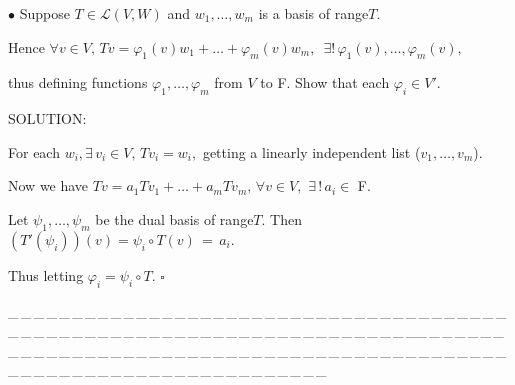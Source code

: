 \documentclass[a4paper, 11pt, UTF8]{article}
\def\Lm{\mathcal{L}}
\begin{document}
\begin{large}
{\small$\bullet$} {\timessl\Large Suppose $T \in \Lm(V, W)$ 
and $w_{1} , \dots , w_{m}$ is a basis of range$T$.}\par\quad
{\timessl\Large
Hence $\forall v \in V,\,Tv=\varphi_{1}(v)w_{1}+\dots+\varphi_{m}(v)w_{m},\,\,\,\exists ! \,\varphi_{1} (v), \dots , \varphi_{m}(v),$}\par\quad
{\timessl\Large
thus defining functions $\varphi_{1}, \dots , \varphi_{m}$ from $V$ to {\timesbf F}. 
Show that each $\varphi_{i} \in V'$.}\par

{\timesbf S\footnotesize{OLUTION:}} $\,\,$\par\quad
For each $w_{i},\exists\,v_{i} \in V,\,Tv_{i}=w_{i},$
getting a linearly independent list ($v_{1},\dots, v_{m}$).\par\quad
Now we have $Tv=a_{1}Tv_{1}+\dots+a_{m}Tv_{m},\,\forall v \in V,$ $\exists\,!\,a_{i}\in$ {\timesbf F}$.$\par\quad
Let $\psi_{1}, \dots, \psi_{m}$ be the dual basis of range$T$. Then $(T'(\psi_{i}))(v)=\psi_{i}\circ T(v)\,=\,a_{i}.$\par\quad
Thus letting $\varphi_{i}=\psi_{i}\circ T.$ \quad$\square$

{\tiny \_\,\_\,\_\,\_\,\_\,\_\,\_\,\_\,\_\,\_\,\_\,\_\,\_\,\_\,\_\,\_\,\_\,\_\,\_\,\_\,\_\,\_\,\_\,\_\,\_\,\_\,\_\,\_\,\_\,\_\,\_\,\_\,\_\,\_\,\_\,\_\,\_\,\_\,\_\,\_\,\_\,\_\,\_\,\_\,\_\,\_\,\_\,\_\,\_\,\_\,\_\,\_\,\_\,\_\,\_\,\_\,\_\,\_\,\_\,\_\,\_\,\_\,\_\,\_\,\_\,\_\,\_\,\_\,\_\,\_\,\_\_\,\_\,\_\,\_\,\_\,\_\,\_\,\_\,\_\,\_\,\_\,\_\,\_\,\_\,\_\,\_\,\_\,\_\,\_\,\_\,\_\,\_\,\_\,\_\,\_\,\_\,\_\,\_\,\_\,\_\,\_\,\_\,\_\,\_\,\_\,\_\,\_\,\_\,\_\,\_\,\_\,\_\,\_\,\_\,\_\,\_\,\_\,\_\,\_\,\_\,\_\,\_\,\_\,\_\,\_\,\_\,\_\,\_\,\_\,\_\,\_\,\_\,\_\,\_\,\_\,\_\,\_\,\_\,\_\,\_\,\_}{\tiny\,\par}


\end{large}
\end{document}
